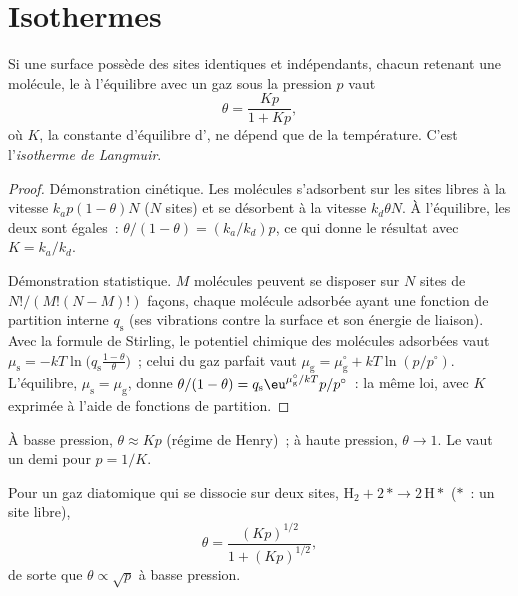 \section{Isothermes}

\begin{theorem}\label{thm:b3:surfaces-catalysis:langmuir}
Si une surface possède des sites identiques et indépendants, chacun
retenant une molécule, le  à l'équilibre avec un gaz
sous la pression $p$ vaut
\[
  \theta = \frac{Kp}{1 + Kp},
\]
où $K$, la constante d'équilibre d', ne dépend que de la
température. C'est l'\emph{isotherme de Langmuir}.
\end{theorem}

\begin{proof}
Démonstration cinétique. Les molécules s'adsorbent sur les sites libres à
la vitesse $k_ap(1 - \theta)N$ ($N$
sites) et se désorbent à la vitesse $k_d\theta N$. À l'équilibre, les
deux sont égales~: $\theta/(1 - \theta)
= (k_a/k_d)p$, ce qui donne le résultat avec $K = k_a/k_d$.

Démonstration statistique. $M$ molécules peuvent se disposer sur $N$
sites de $N!/(M!(N - M)!)$ façons,
chaque molécule adsorbée ayant une fonction de partition interne
$q_{\mathrm s}$ (ses vibrations contre la surface et son énergie de
liaison). Avec la formule de Stirling,
le potentiel chimique des molécules adsorbées vaut $\mu_{\mathrm s} = -kT\ln\bigl(q_{\mathrm s}\frac{1 - \theta}{\theta}\bigr)$~;
celui du gaz parfait vaut $\mu_{\mathrm g} = \mu_{\mathrm g}^\circ + kT\ln(p/p^\circ)$. L'équilibre, $\mu_{\mathrm s} = \mu_{\mathrm g}$, donne
$\theta/(1 - \theta) = q_{\mathrm s}\eu^{\mu_{\mathrm g}^\circ/kT}p/p^\circ$~:
la même loi, avec $K$ exprimée à l'aide de fonctions de partition.
\end{proof}

À basse pression, $\theta \approx Kp$ (régime de Henry)~; à haute
pression, $\theta \to 1$. Le  vaut un demi pour
$p = 1/K$.

\begin{proposition}\label{prop:b3:surfaces-catalysis:dissociative}
Pour un gaz diatomique qui se dissocie sur deux sites, $\mathrm{H_2} + 2\,{*} \to 2\,\mathrm{H}{*}$
(${*}$~: un site libre),
\[
  \theta = \frac{(Kp)^{1/2}}{1 + (Kp)^{1/2}},
\]
de sorte que $\theta \propto \sqrt p$ à basse pression.
\end{proposition}

